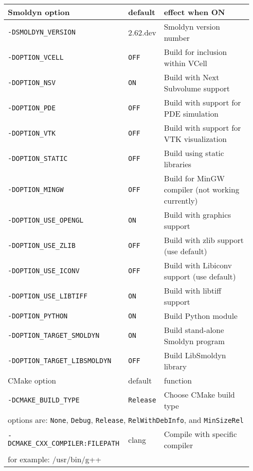 \documentclass {book}
\begin{document}
\begin{longtable}[c]{lll}
Smoldyn option & default & effect when ON\\
\hline
\texttt{-DSMOLDYN\_VERSION} & 2.62.dev & Smoldyn version number\\
\texttt{-DOPTION\_VCELL} & \texttt{OFF} & Build for inclusion within VCell\\
\texttt{-DOPTION\_NSV} & \texttt{ON} & Build with Next Subvolume support\\
\texttt{-DOPTION\_PDE} & \texttt{OFF} & Build with support for PDE simulation\\
\texttt{-DOPTION\_VTK} & \texttt{OFF} & Build with support for VTK visualization\\
\texttt{-DOPTION\_STATIC} & \texttt{OFF} & Build using static libraries\\
\texttt{-DOPTION\_MINGW} & \texttt{OFF} & Build for MinGW compiler (not working currently)\\
\texttt{-DOPTION\_USE\_OPENGL} & \texttt{ON} & Build with graphics support\\
\texttt{-DOPTION\_USE\_ZLIB} & \texttt{OFF} & Build with zlib support (use default)\\
\texttt{-DOPTION\_USE\_ICONV} & \texttt{OFF} & Build with Libiconv support (use default)\\
\texttt{-DOPTION\_USE\_LIBTIFF} & \texttt{ON} & Build with libtiff support\\
\texttt{-DOPTION\_PYTHON} & \texttt{ON} & Build Python module\\
\texttt{-DOPTION\_TARGET\_SMOLDYN} & \texttt{ON} & Build stand-alone Smoldyn program\\
\texttt{-DOPTION\_TARGET\_LIBSMOLDYN} & \texttt{OFF} & Build LibSmoldyn library\\
\hline
CMake option & default & function\\
\hline
\texttt{-DCMAKE\_BUILD\_TYPE} & \texttt{Release} & Choose CMake build type\\
\multicolumn{3}{l}{\hspace{0.3in}options are: \texttt{None}, \texttt{Debug}, \texttt{Release}, \texttt{RelWithDebInfo}, and \texttt{MinSizeRel}}\\
\texttt{-DCMAKE\_CXX\_COMPILER:FILEPATH} & clang & Compile with specific compiler\\
\multicolumn{3}{l}{\hspace{0.3in}for example: /usr/bin/g++}\\
\end{longtable}
\end{document}
